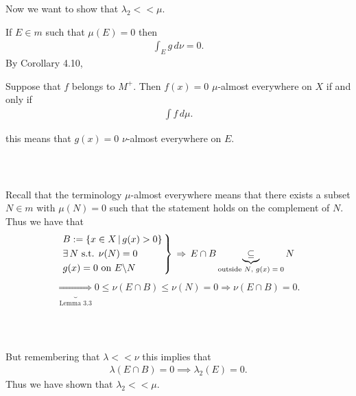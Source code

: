 \documentclass{beamer}
\newenvironment{rcases}{\left.\begin{aligned}}{\end{aligned}\right\rbrace}
\numberwithin{equation}{section}
\begin{document}
\begin{frame}\frametitle{{\normalsize \secname} \\ {\large \subsecname}}
    Now we want to show that $\lambda_2 << \mu$.
    \vspace{1em}

    If $E \in m$ such that $\mu(E) = 0$ then 
    \begin{align}
        \int_E g \, d\nu = 0.
    \end{align}
    By Corollary 4.10,
    \begingroup
    \footnotesize
    \begin{corollary}[4.10]
        Suppose that $f$ belongs to $M^+$.
        Then $f(x) = 0$ $\mu$-almost everywhere on $X$ if and only if
        \begin{align}
            \int f \, d\mu.
        \end{align}
    \end{corollary}
    \endgroup
    this means that $g(x) = 0$ $\nu$-almost everywhere on $E$.
\end{frame}

\begin{frame}\frametitle{{\normalsize \secname} \\ {\large \subsecname}}
    Recall that the terminology $\mu$-almost everywhere means that there exists a subset $N \in m$ with $\mu(N) = 0$ such that the statement holds on the complement of $N$.
    Thus we have that
    \begin{align}
        \begin{rcases}
            &B := \{x \in X \,|\, g(x) > 0 \} \, \\
            &\exists \, N \text{ s.t. } \nu(N) = 0 \\
            &g(x) = 0 \text{ on } E\backslash N
        \end{rcases}
        \, \Rightarrow \, E \cap B \underbrace{\subseteq}_{\text{outside $N$, $g(x) = 0$}} N
    \end{align}
    \begin{align}
        \underbrace{\Rightarrow}_{\text{Lemma 3.3}} 0 \leq \nu(E\cap B) \leq \nu(N) = 0 \Rightarrow \nu(E \cap B) = 0.
    \end{align}
\end{frame}

\begin{frame}\frametitle{{\normalsize \secname} \\ {\large \subsecname}}
    But remembering that $\lambda << \nu$ this implies that
    \begin{align}
        \lambda(E \cap B) = 0 \implies \lambda_2(E) = 0.
    \end{align}
    Thus we have shown that $\lambda_2 << \mu$.
\end{frame}
\end{document}
